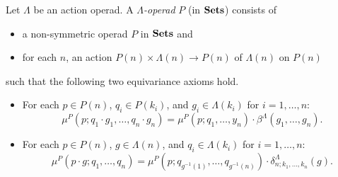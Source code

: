 

\begin{Defi}\label{Defi:lamop}
  Let $\Lambda$ be an action operad. A \textit{$\Lambda$-operad} $P$ (in $\mathbf{Sets}$) consists of
    \begin{itemize}
      \item a non-symmetric operad $P$ in $\mathbf{Sets}$ and
      \item for each $n$, an action $P(n) \times \Lambda(n) \rightarrow P(n)$ of $\Lambda(n)$ on $P(n)$
    \end{itemize}
such that the following two equivariance axioms hold.
  \begin{itemize}
    \item For each $p \in P(n)$, $q_i \in P(k_i)$, and $g_i \in \Lambda(k_i)$ for $i=1, \ldots, n$:
  \[
    \mu^{P}(p; q_{1} \cdot g_{1}, \ldots, q_{n} \cdot g_{n}) = \mu^{P}(p; q_{1}, \ldots, y_{n}) \cdot \beta^{\Lambda}(g_{1}, \ldots, g_{n}).
  \]
    \item For each $p \in P(n)$, $g \in \Lambda(n)$, and $q_i \in \Lambda(k_i)$ for $i=1, \ldots, n$:
  \[
    \mu^{P}(p \cdot g; q_{1}, \ldots, q_{n}) = \mu^{P}\left(p; q_{g^{-1}(1)}, \ldots, q_{g^{-1}(n)}\right) \cdot \delta_{n;k_1,\ldots,k_n}^{\Lambda}(g).
  \]
  \end{itemize}
\end{Defi}


